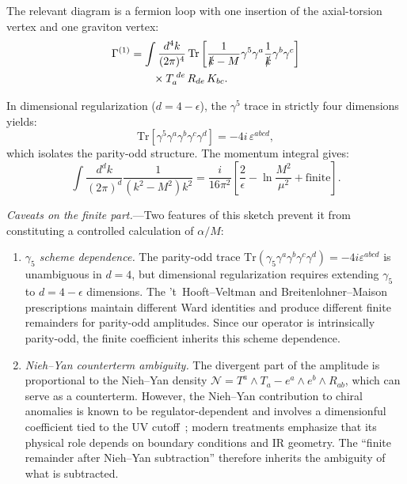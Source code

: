 \documentclass[aps,prd,twocolumn,superscriptaddress,showpacs,preprintnumbers,nofootinbib,longbibliography,floatfix]{revtex4-2}
\begin{document}
The relevant diagram is a fermion loop with one insertion of the axial-torsion vertex and one graviton vertex:
\begin{align}\label{eq:gamma1}
\Gamma^{(1)} &= \int \frac{d^4k}{(2\pi)^4}\,\text{Tr}\left[\frac{1}{\slashed{k}-M}\gamma^5\gamma^a \frac{1}{\slashed{k}}\gamma^b\gamma^c\right]\nonumber\\
&\qquad\times T_a^{\;de}\,R_{de}\,K_{bc}.
\end{align}

In dimensional regularization ($d = 4-\epsilon$), the $\gamma^5$ trace in strictly four dimensions yields:
\begin{equation}
\text{Tr}[\gamma^5\gamma^a\gamma^b\gamma^c\gamma^d] = -4i\,\varepsilon^{abcd},
\end{equation}
which isolates the parity-odd structure. The momentum integral gives:
\begin{equation}
\int \frac{d^dk}{(2\pi)^d}\frac{1}{(k^2-M^2)k^2} = \frac{i}{16\pi^2}\left[\frac{2}{\epsilon}-\ln\frac{M^2}{\mu^2}+\text{finite}\right].
\end{equation}

\textit{Caveats on the finite part.}---Two features of this sketch prevent it from constituting a controlled calculation of $\alpha/M$:

\begin{enumerate}[leftmargin=*]
\item \textit{$\gamma_5$ scheme dependence.} The parity-odd trace $\text{Tr}(\gamma_5\gamma^a\gamma^b\gamma^c\gamma^d)=-4i\varepsilon^{abcd}$ is unambiguous in $d=4$, but dimensional regularization requires extending $\gamma_5$ to $d=4-\epsilon$ dimensions. The 't~Hooft--Veltman and Breitenlohner--Maison prescriptions maintain different Ward identities and produce different finite remainders for parity-odd amplitudes. Since our operator is intrinsically parity-odd, the finite coefficient inherits this scheme dependence.

\item \textit{Nieh--Yan counterterm ambiguity.} The divergent part of the amplitude is proportional to the Nieh--Yan density $\mathcal{N}=T^a\wedge T_a - e^a\wedge e^b\wedge R_{ab}$, which can serve as a counterterm. However, the Nieh--Yan contribution to chiral anomalies is known to be regulator-dependent and involves a dimensionful coefficient tied to the UV cutoff~\cite{NiehYan1982}; modern treatments emphasize that its physical role depends on boundary conditions and IR geometry. The ``finite remainder after Nieh--Yan subtraction'' therefore inherits the ambiguity of what is subtracted.
\end{enumerate}
\end{document}
